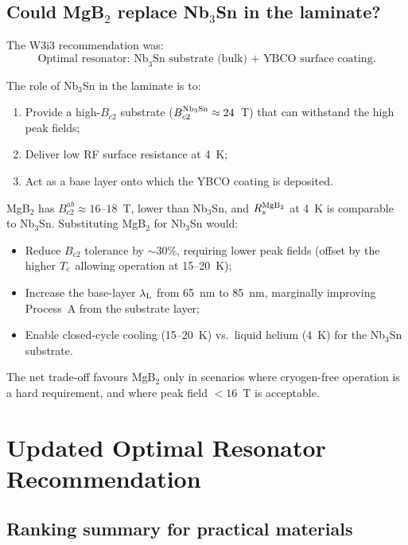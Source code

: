 \documentclass[11pt]{article}
\newcommand{\lambdaL}{\lambda_{\rm L}}
\newcommand{\Tc}{T_{\rm c}}
\begin{document}
\subsection{Could MgB$_2$ replace Nb$_3$Sn in the laminate?}

The W3i3 recommendation was:
\begin{equation}
\text{Optimal resonator: Nb}_3\text{Sn substrate (bulk) + YBCO surface coating.}
\end{equation}

The role of Nb$_3$Sn in the laminate is to:
\begin{enumerate}
\item Provide a high-$B_{c2}$ substrate ($B_{c2}^{\rm Nb_3Sn} \approx 24$~T)
  that can withstand the high peak fields;
\item Deliver low RF surface resistance at 4~K;
\item Act as a base layer onto which the YBCO coating is deposited.
\end{enumerate}

MgB$_2$ has $B_{c2}^{ab} \approx 16$--$18$~T, lower than Nb$_3$Sn, and
$R_s^{\rm MgB_2}$ at 4~K is comparable to Nb$_3$Sn. Substituting MgB$_2$ for
Nb$_3$Sn would:
\begin{itemize}
\item Reduce $B_{c2}$ tolerance by $\sim 30$\%, requiring lower peak fields
  (offset by the higher $\Tc$ allowing operation at 15--20~K);
\item Increase the base-layer $\lambdaL$ from 65~nm to 85~nm, marginally
  improving Process~A from the substrate layer;
\item Enable closed-cycle cooling (15--20~K) vs.\ liquid helium (4~K) for
  the Nb$_3$Sn substrate.
\end{itemize}

The net trade-off favours MgB$_2$ only in scenarios where cryogen-free
operation is a hard requirement, and where peak field $< 16$~T is acceptable.

\section{Updated Optimal Resonator Recommendation}
\label{sec:recommendation}

\subsection{Ranking summary for practical materials}
\end{document}
